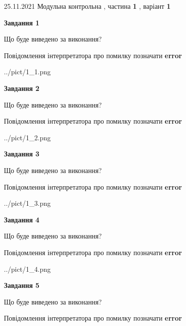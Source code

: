 \documentclass[10pt, ukrainian]{article}
\begin{document}
{25.11.2021 Модульна контрольна , частина \textbf { 1 }, варіант  \No \textbf { 1 }\par}
{
\begin {large}

{\begin {center}\textbf{Завдання 1}\end {center}}\par
Що буде виведено за виконання? \par
Повідомлення інтерпретатора про помилку позначати \textbf{error}

\begin{center}
	{../pict/1_1.png}
\end{center}
\newpage

{\begin {center}\textbf{Завдання 2}\end {center}}\par
Що буде виведено за виконання? \par
Повідомлення інтерпретатора про помилку позначати \textbf{error}

\begin{center}
	{../pict/1_2.png}
\end{center}
\newpage

{\begin {center}\textbf{Завдання 3}\end {center}}\par
Що буде виведено за виконання? \par
Повідомлення інтерпретатора про помилку позначати \textbf{error}

\begin{center}
	{../pict/1_3.png}
\end{center}
\newpage

{\begin {center}\textbf{Завдання 4}\end {center}}\par
Що буде виведено за виконання? \par
Повідомлення інтерпретатора про помилку позначати \textbf{error}

\begin{center}
	{../pict/1_4.png}
\end{center}
\newpage

{\begin {center}\textbf{Завдання 5}\end {center}}\par
Що буде виведено за виконання? \par
Повідомлення інтерпретатора про помилку позначати \textbf{error}


\end{large}}
\end{document}
